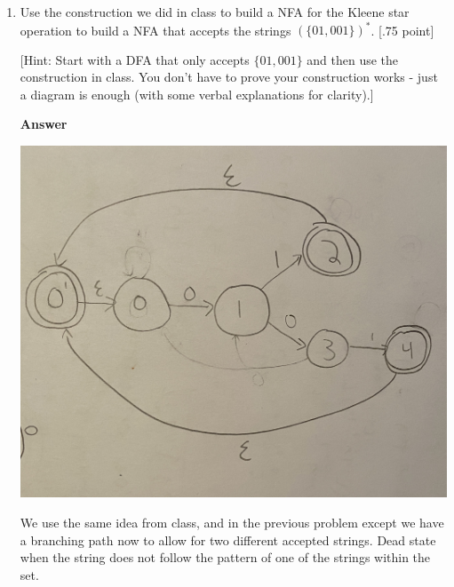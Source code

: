 \documentclass[11pt]{article}
\newcommand \kw[1]{\textbf{#1}}
\newenvironment{answer}{
\vspace{.5cm}
\kw{Answer} 

}
{
\pagebreak
}
\begin{document}
\begin{enumerate}
\begin{answer}
    Following the hint, the DFA shown will only progress towards the accepting state if the sequence 011 is followed. If it is not, then the state is reset back to the state where a 0 has been seen. However, if 011 is encountered then the DFA enters a persistent accepting state. That is, it is not possible to leave the accepting state once it has been entered. This is consistent with the fact that if 011 is encountered within an input then the input string will always contain 011 (it won't magically disappear somewhere).
\end{answer}

\item Use the construction we did in class to build a NFA for the Kleene star operation to build a NFA that accepts the strings $(\{01, 001\})^*$. [.75 point]

[Hint: Start with a DFA that only accepts $\{01, 001\}$ and then use the construction in class. You don't have to prove your construction works - just a diagram is enough (with some verbal explanations for clarity).]

\begin{answer}
    \includegraphics[scale=.15]{nfa-4.jpg}

    We use the same idea from class, and in the previous problem except we have a branching path now to allow for two different accepted strings. Dead state when the string does not follow the pattern of one of the strings within the set.
\end{answer}


\end{enumerate}
\end{document}
